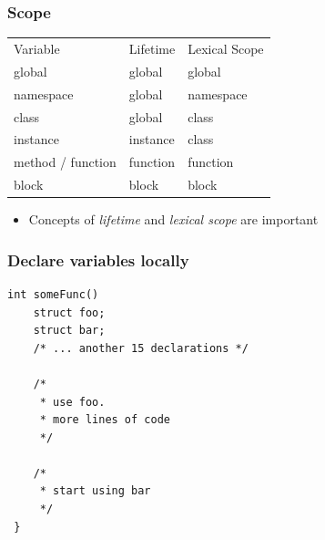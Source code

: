 \documentclass[table]{beamer}
\newcounter{rulecount}
\newcommand{\declarerule}{\textbf{\color{themeblue}{Rule \therulecount:}} }
\newcommand{\declarelesson}{\textbf{\color{themegreen}{Lesson:}} }
\begin{document}
\begin{frame}
    \frametitle{\declarelesson Scope}

    \begin{table}[tl]
        \begin{tabular}{p{3cm}p{2.5cm}p{2.5cm}}
            \rowcolor{codebg}
            \color{white} Variable & \color{white} Lifetime & \color{white} Lexical Scope\\
                          global & global & global \\
                       namespace & global & namespace \\
                        class & global & class \\
                     instance & instance & class \\
                     method / function & function & function \\
                     block & block & block \\
        \end{tabular}
    \end{table}
    \begin{itemize}
        \item Concepts of \emph{lifetime} and \emph{lexical scope} are important
    \end{itemize}
\end{frame}


\begin{frame}[fragile]
    \frametitle{\declarerule Declare variables locally}
    \begin{lstlisting}[title=In ANSI C variables must be declared at the beginning of scope]
int someFunc() 
    struct foo;
    struct bar;
    /* ... another 15 declarations */

    /* 
     * use foo.
     * more lines of code
     */

    /* 
     * start using bar
     */
 }
    \end{lstlisting}
\end{frame}
\end{document}

